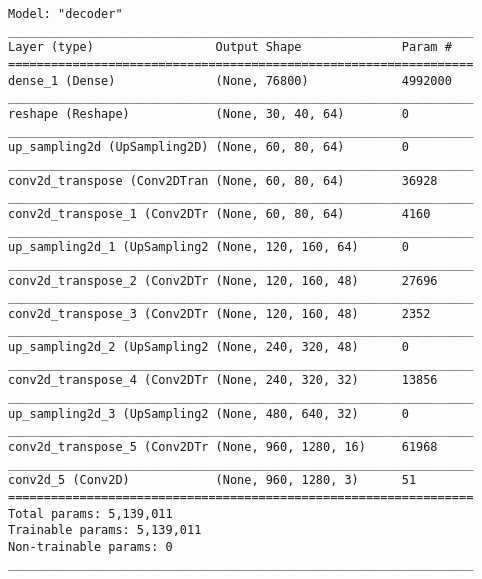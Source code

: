 \documentclass[12pt]{article}
\begin{document}
\begin{verbatim}
Model: "decoder"
_________________________________________________________________
Layer (type)                 Output Shape              Param #   
=================================================================
dense_1 (Dense)              (None, 76800)             4992000   
_________________________________________________________________
reshape (Reshape)            (None, 30, 40, 64)        0         
_________________________________________________________________
up_sampling2d (UpSampling2D) (None, 60, 80, 64)        0         
_________________________________________________________________
conv2d_transpose (Conv2DTran (None, 60, 80, 64)        36928     
_________________________________________________________________
conv2d_transpose_1 (Conv2DTr (None, 60, 80, 64)        4160      
_________________________________________________________________
up_sampling2d_1 (UpSampling2 (None, 120, 160, 64)      0         
_________________________________________________________________
conv2d_transpose_2 (Conv2DTr (None, 120, 160, 48)      27696     
_________________________________________________________________
conv2d_transpose_3 (Conv2DTr (None, 120, 160, 48)      2352      
_________________________________________________________________
up_sampling2d_2 (UpSampling2 (None, 240, 320, 48)      0         
_________________________________________________________________
conv2d_transpose_4 (Conv2DTr (None, 240, 320, 32)      13856     
_________________________________________________________________
up_sampling2d_3 (UpSampling2 (None, 480, 640, 32)      0         
_________________________________________________________________
conv2d_transpose_5 (Conv2DTr (None, 960, 1280, 16)     61968     
_________________________________________________________________
conv2d_5 (Conv2D)            (None, 960, 1280, 3)      51        
=================================================================
Total params: 5,139,011
Trainable params: 5,139,011
Non-trainable params: 0
_________________________________________________________________
\end{verbatim}
\end{document}
